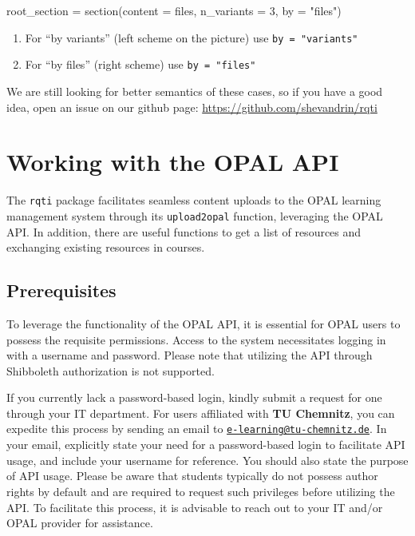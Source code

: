 \documentclass[twoside]{tufte-book}
\newenvironment{Shaded}{}{}
\newcommand{\AttributeTok}[1]{\textcolor[rgb]{0.49,0.56,0.16}{#1}}
\newcommand{\DecValTok}[1]{\textcolor[rgb]{0.25,0.63,0.44}{#1}}
\newcommand{\FunctionTok}[1]{\textcolor[rgb]{0.02,0.16,0.49}{#1}}
\newcommand{\NormalTok}[1]{#1}
\newcommand{\OtherTok}[1]{\textcolor[rgb]{0.00,0.44,0.13}{#1}}
\newcommand{\StringTok}[1]{\textcolor[rgb]{0.25,0.44,0.63}{#1}}
\providecommand{\tightlist}{%
  \setlength{\itemsep}{0pt}\setlength{\parskip}{0pt}}
\begin{document}
\begin{Shaded}
\begin{Highlighting}[]
\NormalTok{root\_section }\OtherTok{=} \FunctionTok{section}\NormalTok{(}\AttributeTok{content =}\NormalTok{ files, }\AttributeTok{n\_variants =} \DecValTok{3}\NormalTok{, }\AttributeTok{by =} \StringTok{"files"}\NormalTok{)}
\end{Highlighting}
\end{Shaded}

\begin{enumerate}
\def\labelenumi{\arabic{enumi}.}
\tightlist
\item
  For ``by variants'' (left scheme on the picture) use \texttt{by\ =\ "variants"}
\item
  For ``by files'' (right scheme) use \texttt{by\ =\ "files"}
\end{enumerate}

We are still looking for better semantics of these cases, so if you have a good idea, open an issue on our github page: \url{https://github.com/shevandrin/rqti}

\chapter{Working with the OPAL API}\label{working-with-the-opal-api}

The \texttt{rqti} package facilitates seamless content uploads to the OPAL learning management system through its \texttt{upload2opal} function, leveraging the OPAL API. In addition, there are useful functions to get a list of resources and exchanging existing resources in courses.

\section{Prerequisites}\label{prerequisites}

To leverage the functionality of the OPAL API, it is essential for OPAL users to possess the requisite permissions. Access to the system necessitates logging in with a username and password. Please note that utilizing the API through Shibboleth authorization is not supported.

If you currently lack a password-based login, kindly submit a request for one through your IT department. For users affiliated with \textbf{TU Chemnitz}, you can expedite this process by sending an email to \href{mailto:e-learning@tu-chemnitz.de}{\nolinkurl{e-learning@tu-chemnitz.de}}. In your email, explicitly state your need for a password-based login to facilitate API usage, and include your username for reference. You should also state the purpose of API usage. Please be aware that students typically do not possess author rights by default and are required to request such privileges before utilizing the API. To facilitate this process, it is advisable to reach out to your IT and/or OPAL provider for assistance.
\end{document}
